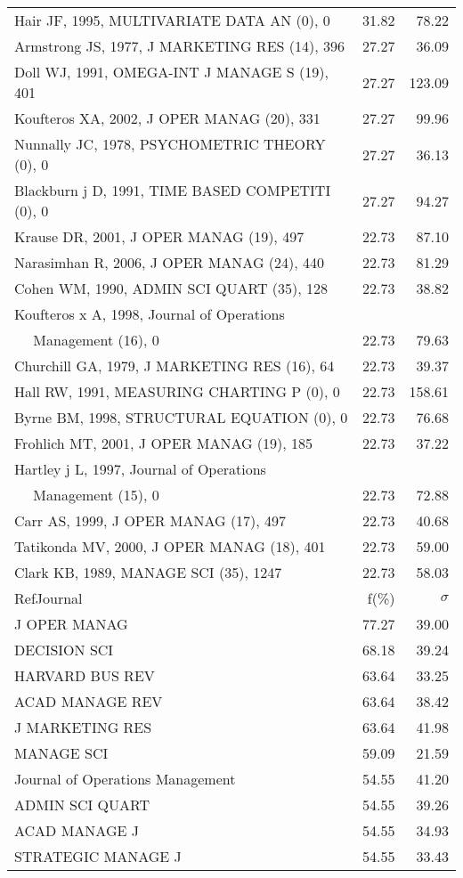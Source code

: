 \documentclass[a4paper,11pt]{report}
\begin{document}
\begin{landscape}
\begin{table}[!ht]
{\begin{tabular}{|l r r|}
Hair JF, 1995, MULTIVARIATE DATA AN (0), 0 & 31.82 & 78.22\\
Armstrong JS, 1977, J MARKETING RES (14), 396 & 27.27 & 36.09\\
Doll WJ, 1991, OMEGA-INT J MANAGE S (19), 401 & 27.27 & 123.09\\
Koufteros XA, 2002, J OPER MANAG (20), 331 & 27.27 & 99.96\\
Nunnally JC, 1978, PSYCHOMETRIC THEORY (0), 0 & 27.27 & 36.13\\
Blackburn j D, 1991, TIME BASED COMPETITI (0), 0 & 27.27 & 94.27\\
Krause DR, 2001, J OPER MANAG (19), 497 & 22.73 & 87.10\\
Narasimhan R, 2006, J OPER MANAG (24), 440 & 22.73 & 81.29\\
Cohen WM, 1990, ADMIN SCI QUART (35), 128 & 22.73 & 38.82\\
Koufteros x A, 1998, Journal of Operations &  & \\
$\quad$ Management (16), 0 & 22.73 & 79.63\\
Churchill GA, 1979, J MARKETING RES (16), 64 & 22.73 & 39.37\\
Hall RW, 1991, MEASURING CHARTING P (0), 0 & 22.73 & 158.61\\
Byrne BM, 1998, STRUCTURAL EQUATION (0), 0 & 22.73 & 76.68\\
Frohlich MT, 2001, J OPER MANAG (19), 185 & 22.73 & 37.22\\
Hartley j L, 1997, Journal of Operations &  & \\
$\quad$ Management (15), 0 & 22.73 & 72.88\\
Carr AS, 1999, J OPER MANAG (17), 497 & 22.73 & 40.68\\
Tatikonda MV, 2000, J OPER MANAG (18), 401 & 22.73 & 59.00\\
Clark KB, 1989, MANAGE SCI (35), 1247 & 22.73 & 58.03\\
\hline
\hline
RefJournal & f(\%) & $\sigma$\\
\hline
J OPER MANAG & 77.27 & 39.00\\
DECISION SCI & 68.18 & 39.24\\
HARVARD BUS REV & 63.64 & 33.25\\
ACAD MANAGE REV & 63.64 & 38.42\\
J MARKETING RES & 63.64 & 41.98\\
MANAGE SCI & 59.09 & 21.59\\
Journal of Operations Management & 54.55 & 41.20\\
ADMIN SCI QUART & 54.55 & 39.26\\
ACAD MANAGE J & 54.55 & 34.93\\
STRATEGIC MANAGE J & 54.55 & 33.43\\
\hline
\end{tabular}
}
\end{table}

\end{landscape}
\end{document}
